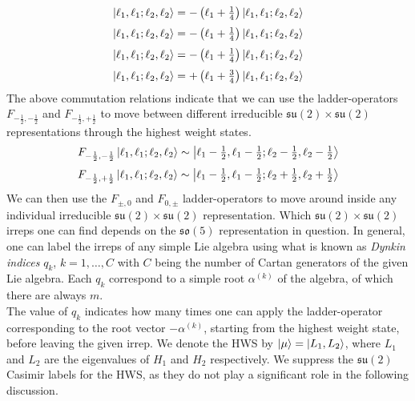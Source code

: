 %
%
\begin{equation}
[J_1^2, F_{-\frac{1}{2},-\frac{1}{2}}] \ket{\ell_1, \ell_1; \ell_2, \ell_2}
=
-\left( \ell_1 + \tfrac{1}{4} \right) \ket{\ell_1, \ell_1; \ell_2, \ell_2}
\end{equation}
%
%
\begin{equation}
[J_1^2, F_{-\frac{1}{2},+\frac{1}{2}}] \ket{\ell_1, \ell_1; \ell_2, \ell_2}
=
-\left( \ell_1 + \tfrac{1}{4} \right) \ket{\ell_1, \ell_1; \ell_2, \ell_2}
\end{equation}
%
%
\begin{equation}
[J_2^2, F_{-\frac{1}{2},-\frac{1}{2}}] \ket{\ell_1, \ell_1; \ell_2, \ell_2}
=
-\left( \ell_1 + \tfrac{1}{4} \right) \ket{\ell_1, \ell_1; \ell_2, \ell_2}
\end{equation}
%
%
\begin{equation}
[J_2^2, F_{-\frac{1}{2},+\frac{1}{2}}] \ket{\ell_1, \ell_1; \ell_2, \ell_2}
=
+\left( \ell_1 + \tfrac{3}{4} \right) \ket{\ell_1, \ell_1; \ell_2, \ell_2}
\end{equation}
%
%
The above commutation relations indicate that we can use the ladder-operators $F_{-\frac{1}{2},-\frac{1}{2}}$ and $F_{-\frac{1}{2},+\frac{1}{2}}$ to move between different irreducible $\mathfrak{su}(2) \times \mathfrak{su}(2)$ representations through the highest weight states.
%
%
\begin{equation}
F_{-\frac{1}{2},-\frac{1}{2}} \ket{\ell_1, \ell_1; \ell_2, \ell_2}
\sim
\ket{\ell_1 - \tfrac{1}{2}, \ell_1 - \tfrac{1}{2}; \ell_2 - \tfrac{1}{2}, \ell_2 - \tfrac{1}{2}}
\end{equation}
%
%
\begin{equation}
F_{-\frac{1}{2},+\frac{1}{2}} \ket{\ell_1, \ell_1; \ell_2, \ell_2}
\sim
\ket{\ell_1 - \tfrac{1}{2}, \ell_1 - \tfrac{1}{2}; \ell_2 + \tfrac{1}{2}, \ell_2 + \tfrac{1}{2}}
\end{equation}
%
%
We can then use the $F_{\pm,0}$ and $F_{0,\pm}$ ladder-operators to move around inside any individual irreducible $\mathfrak{su}(2) \times \mathfrak{su}(2)$ representation. Which $\mathfrak{su}(2) \times \mathfrak{su}(2)$ irreps one can find depends on the $\mathfrak{so}(5)$ representation in question. In general, one can label the irreps of any simple Lie algebra using what is known as \textit{Dynkin indices} $q_k$, $k = 1, \ldots , C$ with $C$ being the number of Cartan generators of the given Lie algebra. Each $q_k$ correspond to a simple root $\alpha^{(k)}$ of the algebra, of which there are always $m$.\\
The value of $q_k$ indicates how many times one can apply the ladder-operator corresponding to the root vector $-\alpha^{(k)}$, starting from the highest weight state, before leaving the given irrep. We denote the HWS by $\ket{\mu} = \ket{L_1, L_2}$, where $L_1$ and $L_2$ are the eigenvalues of $H_1$ and $H_2$ respectively. We suppress the $\mathfrak{su}(2)$ Casimir labels for the HWS, as they do not play a significant role in the following discussion.\\
